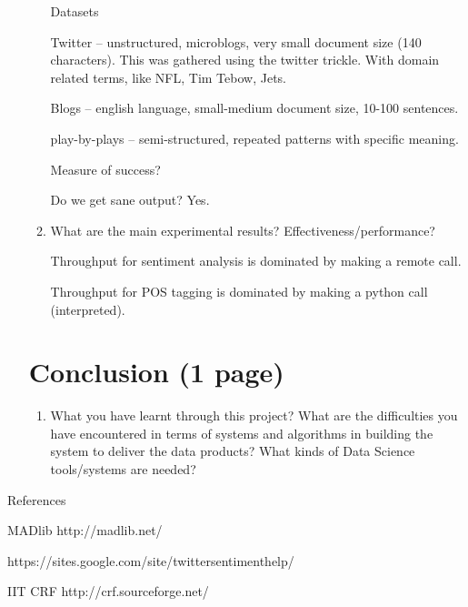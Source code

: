 \documentclass{article}
\begin{document}
\begin{enumerate}
\begin{enumerate}
    Datasets

    Twitter -- unstructured, microblogs, very small document size (140 characters). This was gathered using the twitter trickle. With domain related terms, like NFL, Tim Tebow, Jets.

    Blogs -- english language, small-medium document size, 10-100 sentences.

    play-by-plays -- semi-structured, repeated patterns with specific meaning.

    Measure of success?

    Do we get sane output? Yes.

  \item What are the main experimental results? Effectiveness/performance?

    Throughput for sentiment analysis is dominated by making a remote call.

    Throughput for POS tagging is dominated by making a python call (interpreted).

  \end{enumerate}

  \section{Conclusion (1 page)}
  \begin{enumerate}\item What you have learnt through this project?
    What are the difficulties you have encountered in terms of systems and algorithms in building the system to deliver the data products?
    What kinds of Data Science tools/systems are needed?
  \end{enumerate}
\end{enumerate}

References

MADlib http://madlib.net/

https://sites.google.com/site/twittersentimenthelp/

IIT CRF http://crf.sourceforge.net/
\end{document}
